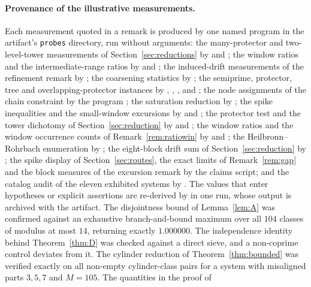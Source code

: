 \documentclass[11pt]{article}
\theoremstyle{plain}
\theoremstyle{definition}
\begin{document}
{\sloppy
\paragraph{Provenance of the illustrative measurements.}
Each measurement quoted in a remark is produced by one named
program in the artifact's \texttt{probes} directory, run without
arguments: the many-protector and two-level-tower measurements
of Section~\ref{sec:reductions} by  and
; the window ratios and the
intermediate-range ratios by  and
; the induced-drift measurements of
the refinement remark by ;
the coarsening statistics by ; the
semiprime, protector, tree and overlapping-protector instances
by , ,
, 
and ; the node assignments of the
chain constraint by the program ;
the saturation reduction by ; the
spike inequalities and the small-window excursions by
 and ; the
protector test and the tower dichotomy of
Section~\ref{sec:reduction} by  and
; the window ratios and the
window occurrence counts of Remark~\ref{rem:ratiowin} by
 and ; the
Heilbronn--Rohrbach enumeration by ; the
eight-block drift sum of Section~\ref{sec:reduction} by
; the spike display of
Section~\ref{sec:routes}, the exact limits of Remark~\ref{rem:gap}
and the block measures of the excursion remark by the claims
script;
and the catalog audit of the eleven exhibited systems by
.  The
values that enter hypotheses or explicit assertions are
re-derived by  in one run,
whose output is archived with the artifact.  The disjointness bound
of Lemma~\ref{lem:A} was confirmed against an exhaustive
branch-and-bound maximum over all $104$ classes of modulus at most $14$, returning exactly $1.000000$.  The independence
identity behind Theorem~\ref{thm:D} was checked against a direct
sieve, and a non-coprime control deviates from it.  The
cylinder reduction of Theorem~\ref{thm:bounded} was verified
exactly on all non-empty cylinder-class pairs for a system with
misaligned parts $3,5,7$ and $M=105$.  The quantities in the proof of
}
\end{document}
